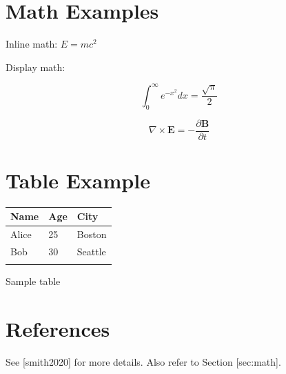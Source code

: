 \documentclass[11pt,a4paper]{article}
\begin{document}
\section{Math Examples}

Inline math: $E = mc^2$

Display math:

$$\int_0^\infty e^{-x^2} dx = \frac{\sqrt{\pi}}{2}$$

$$\nabla \times \mathbf{E} = -\frac{\partial \mathbf{B}}{\partial t}$$

\section{Table Example}

\begin{table}[h]
\begin{tabular}{|l|l|l|}
\hline
Name & Age & City \\ \hline
Alice & 25 & Boston \\ \hline
Bob & 30 & Seattle \\ \hline
 &  &  \\ \hline
\end{tabular}
\end{table}

Sample table

\section{References}

See [smith2020] for more details. Also refer to Section [sec:math].
\end{document}
